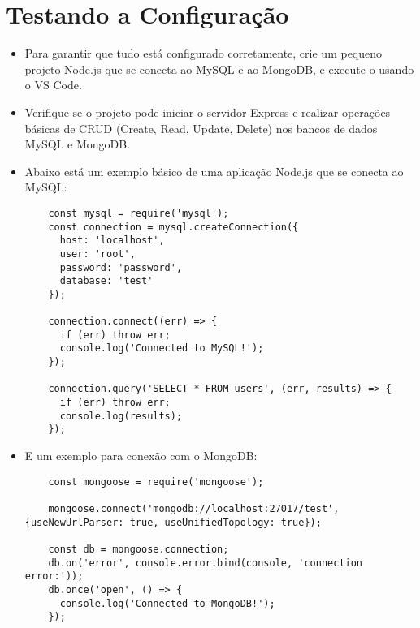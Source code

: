 \section{Testando a Configuração}
\begin{itemize}
    \item Para garantir que tudo está configurado corretamente, crie um pequeno projeto Node.js que se conecta ao MySQL e ao MongoDB, e execute-o usando o VS Code.
    
    \item Verifique se o projeto pode iniciar o servidor Express e realizar operações básicas de CRUD (Create, Read, Update, Delete) nos bancos de dados MySQL e MongoDB.
    
    \item Abaixo está um exemplo básico de uma aplicação Node.js que se conecta ao MySQL:
    \begin{verbatim}
    const mysql = require('mysql');
    const connection = mysql.createConnection({
      host: 'localhost',
      user: 'root',
      password: 'password',
      database: 'test'
    });

    connection.connect((err) => {
      if (err) throw err;
      console.log('Connected to MySQL!');
    });

    connection.query('SELECT * FROM users', (err, results) => {
      if (err) throw err;
      console.log(results);
    });
    \end{verbatim}
    
    \item E um exemplo para conexão com o MongoDB:
    \begin{verbatim}
    const mongoose = require('mongoose');

    mongoose.connect('mongodb://localhost:27017/test', {useNewUrlParser: true, useUnifiedTopology: true});

    const db = mongoose.connection;
    db.on('error', console.error.bind(console, 'connection error:'));
    db.once('open', () => {
      console.log('Connected to MongoDB!');
    });
    \end{verbatim}
\end{itemize}

